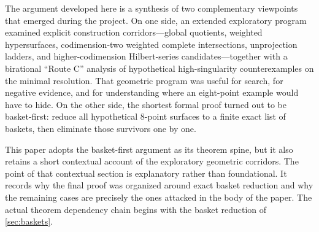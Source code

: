 \documentclass[11pt]{article}
\theoremstyle{definition}
\begin{document}
The argument developed here is a synthesis of two complementary viewpoints that emerged during the project.
On one side, an extended exploratory program examined explicit construction corridors---global quotients, weighted hypersurfaces, codimension-two weighted complete intersections, unprojection ladders, and higher-codimension Hilbert-series candidates---together with a birational ``Route C'' analysis of hypothetical high-singularity counterexamples on the minimal resolution. That geometric program was useful for search, for negative evidence, and for understanding where an eight-point example would have to hide. On the other side, the shortest formal proof turned out to be basket-first: reduce all hypothetical $8$-point surfaces to a finite exact list of baskets, then eliminate those survivors one by one.

This paper adopts the basket-first argument as its theorem spine, but it also retains a short contextual account of the exploratory geometric corridors. The point of that contextual section is explanatory rather than foundational. It records why the final proof was organized around exact basket reduction and why the remaining cases are precisely the ones attacked in the body of the paper. The actual theorem dependency chain begins with the basket reduction of \cref{sec:baskets}.
\end{document}
